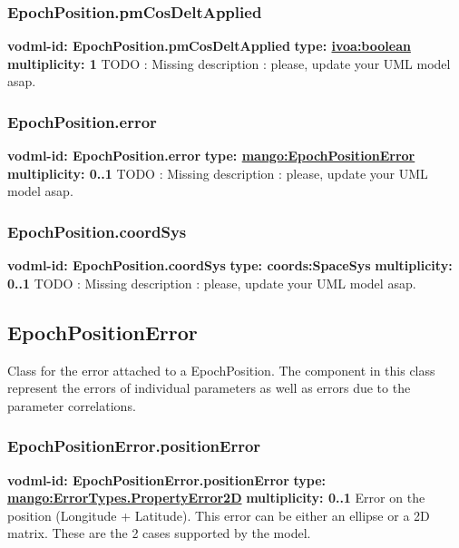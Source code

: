     \subsubsection{EpochPosition.pmCosDeltApplied}
      \textbf{vodml-id: EpochPosition.pmCosDeltApplied} \newline
      \textbf{type: \hyperref[sect:ivoa]{ivoa:boolean}} \newline
      \textbf{multiplicity: 1} \newline
      TODO : Missing description : please, update your UML model asap.

    \subsubsection{EpochPosition.error}
      \textbf{vodml-id: EpochPosition.error} \newline
      \textbf{type: \hyperref[sect:EpochPositionError]{mango:EpochPositionError}} \newline
      \textbf{multiplicity: 0..1} \newline
      TODO : Missing description : please, update your UML model asap.

    \subsubsection{EpochPosition.coordSys}
      \textbf{vodml-id: EpochPosition.coordSys} \newline
      \textbf{type: coords:SpaceSys} \newline
      \textbf{multiplicity: 0..1} \newline
      TODO : Missing description : please, update your UML model asap.

  \subsection{EpochPositionError}
  \label{sect:EpochPositionError}
    Class for the error attached to a EpochPosition. The component in this class represent the errors of individual parameters as well as errors due to the parameter correlations.

    \subsubsection{EpochPositionError.positionError}
      \textbf{vodml-id: EpochPositionError.positionError} \newline
      \textbf{type: \hyperref[sect:ErrorTypes.PropertyError2D]{mango:ErrorTypes.PropertyError2D}} \newline
      \textbf{multiplicity: 0..1} \newline
      Error on the position (Longitude + Latitude). This error can be either an ellipse or a 2D matrix. These are the 2 cases supported by the model.

